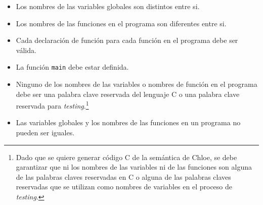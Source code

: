\begin{itemize}
  \item{Los nombres de las variables globales son distintos entre si.}
  \item{Los nombres de las funciones en el programa son diferentes entre si.}
  \item{Cada declaración de función para cada función en el programa debe ser válida.}
  \item{La función \verb|main| debe estar definida.}
  \item{Ninguno de los nombres de las variables o nombres de función en el programa debe ser una palabra clave reservada del lenguaje C o una palabra clave reservada para \textit{testing}.\footnote{Dado que se quiere generar código C de la semántica de Chloe, se debe garantizar que ni los nombres de las variables ni de las funciones son alguna de las palabras claves reservadas en C o alguna de las palabras claves reservadas que se utilizan como nombres de variables en el proceso de \textit{testing}.}}
  \item{Las variables globales y los nombres de las funciones en un programa no pueden ser iguales.}
\end{itemize}



